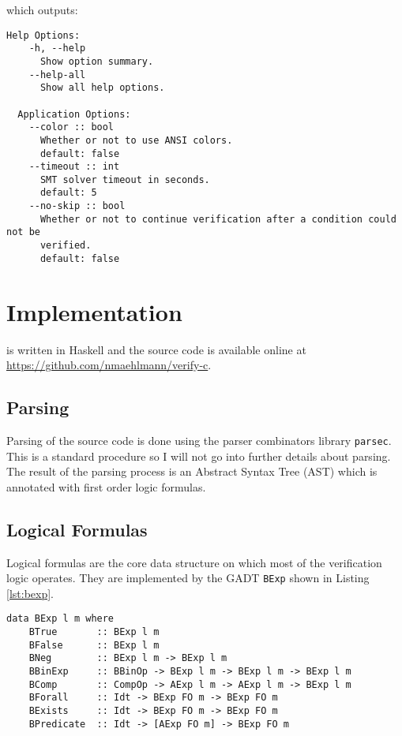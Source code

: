 \documentclass[12pt]{article}
\begin{document}
which outputs:

\begin{minipage}{\linewidth}
\begin{lstlisting}[style=cmd]
    Help Options:
    -h, --help
      Show option summary.
    --help-all
      Show all help options.
  
  Application Options:
    --color :: bool
      Whether or not to use ANSI colors.
      default: false
    --timeout :: int
      SMT solver timeout in seconds.
      default: 5
    --no-skip :: bool
      Whether or not to continue verification after a condition could not be
      verified.
      default: false
\end{lstlisting}
\end{minipage}


\section{Implementation}

\verifyc is written in Haskell and the source code is available online at \url{https://github.com/nmaehlmann/verify-c}.

\subsection{Parsing}

Parsing of the source code is done using the parser combinators library \texttt{parsec}.
This is a standard procedure so I will not go into further details about parsing.
The result of the parsing process is an Abstract Syntax Tree (AST) which is annotated with first order logic formulas. 

\subsection{Logical Formulas}

Logical formulas are the core data structure on which most of the verification logic operates.
They are implemented by the GADT \texttt{BExp} shown in Listing \ref{lst:bexp}.

\begin{lstlisting}[style=c0, caption=BExp, label=lst:bexp]
data BExp l m where
    BTrue       :: BExp l m
    BFalse      :: BExp l m
    BNeg        :: BExp l m -> BExp l m
    BBinExp     :: BBinOp -> BExp l m -> BExp l m -> BExp l m
    BComp       :: CompOp -> AExp l m -> AExp l m -> BExp l m
    BForall     :: Idt -> BExp FO m -> BExp FO m
    BExists     :: Idt -> BExp FO m -> BExp FO m
    BPredicate  :: Idt -> [AExp FO m] -> BExp FO m
\end{lstlisting}
\end{document}
